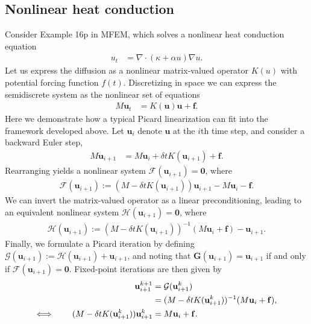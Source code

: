 \documentclass[review]{siamart}
\begin{document}
\subsection{Nonlinear heat conduction}\label{sec:numerics_nonlin:heat}

Consider Example 16p in MFEM, which solves a nonlinear heat conduction equation
%
\begin{align*}
u_t  & = \nabla\cdot (\kappa + \alpha u) \nabla u.
\end{align*}
%
Let us express the diffusion as a nonlinear matrix-valued operator $K(u)$ with
potential forcing function $f(t)$. Discretizing in space we can express the semidiscrete 
system as the nonlinear set of equations
%
\begin{align*}
M\mathbf{u}_t & = K(\mathbf{u})\mathbf{u} + \mathbf{f}.
\end{align*}
%
Here we demonstrate how a typical Picard linearization can fit into the 
framework developed above. Let $\mathbf{u}_i$ denote $\mathbf{u}$ at the $i$th
time step, and consider a backward Euler step,
%
\begin{align*}
M\mathbf{u}_{i+1} & = M\mathbf{u}_i + \delta tK(\mathbf{u}_{i+1}) + \mathbf{f}.
\end{align*}
%
Rearranging yields a nonlinear system $\mathcal{F}(\mathbf{u}_{i+1}) = \mathbf{0}$,
where
%
\begin{align*}
\mathcal{F}(\mathbf{u}_{i+1}) := 
	(M - \delta t K(\mathbf{u}_{i+1}))\mathbf{u}_{i+1} - M\mathbf{u}_i - \mathbf{f}.
\end{align*}
%
We can invert the matrix-valued operator as a linear preconditioning, leading
to an equivalent nonlinear system $\mathcal{H}(\mathbf{u}_{i+1}) = \mathbf{0}$,
where
%
\begin{align*}
\mathcal{H}(\mathbf{u}_{i+1}) := 
	(M - \delta t K(\mathbf{u}_{i+1}))^{-1}(M\mathbf{u}_i + \mathbf{f}) - \mathbf{u}_{i+1}.
\end{align*}
%
Finally, we formulate a Picard iteration by defining $\mathcal{G}(\mathbf{u}_{i+1}) :=
\mathcal{H}(\mathbf{u}_{i+1}) + \mathbf{u}_{i+1}$, and noting that
$\mathbf{G}(\mathbf{u}_{i+1}) = \mathbf{u}_{i+1}$ if and only if
$\mathcal{F}(\mathbf{u}_{i+1}) = \mathbf{0}$. Fixed-point iterations are then
given by 
%
\begin{align*}
\mathbf{u}_{i+1}^{k+1} & = \mathcal{G}(\mathbf{u}_{i+1}^k) \\
& = (M - \delta t K(\mathbf{u}_{i+1}^k))^{-1}(M\mathbf{u}_i + \mathbf{f}), \\
\Longleftrightarrow\hspace{5ex}
(M - \delta t K(\mathbf{u}_{i+1}^k))\mathbf{u}_{i+1}^k& = M\mathbf{u}_i + \mathbf{f}.\
\end{align*}
%
\end{document}
